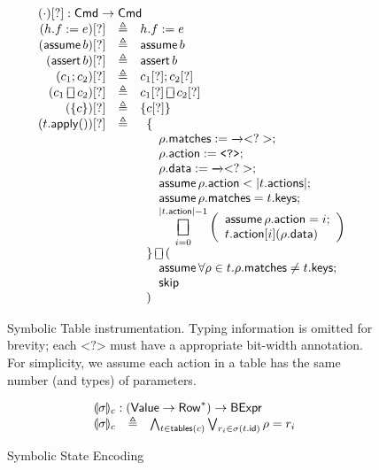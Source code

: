 \documentclass{article}
\newcommand{\Value}{\mathsf{Value}}
\newcommand{\BExpr}{\mathsf{BExpr}}
\newcommand{\Cmd}{\mathsf{Cmd}}
\newcommand{\Row}{\mathsf{Row}}
\newcommand{\matches}{\mathsf{matches}}
\newcommand{\action}{\mathsf{action}}
\newcommand{\actions}{\mathsf{actions}}
\newcommand{\keys}{\mathsf{keys}}
\newcommand{\data}{\mathsf{data}}
\newcommand{\id}{\mathsf{id}}
\newcommand{\assert}{\mathop{\mathsf{assert}}}
\newcommand{\assume}{\mathop{\mathsf{assume}}}
\newcommand{\apply}{\mathsf{apply}}
\newcommand{\choiceop}{\rotatebox[origin=c]{90}{$\sqsubset\!\!\!\sqsupset$}}
\newcommand{\choice}{\mathbin{\choiceop}}
\DeclareMathOperator*{\bigchoice}{\scalerel*{\choiceop}{\sum}}
\newcommand{\havoc}{\texttt{<?>}}
\newcommand{\SKIP}{\mathsf{skip}}
\newcommand{\state}[1]{\llparenthesis#1\rrparenthesis}
\newcommand{\tables}{\mathop{\mathsf{tables}}}
\begin{document}
\begin{figure}[htp]
  \[\begin{array}{r >{\triangleq}cl}
  \multicolumn{3}{l}{(\cdot)[?] : \Cmd \to \Cmd} \\
  (h.f := e)[?] && h.f := e \\
  (\assume b)[?] && \assume b \\
  (\assert b)[?] && \assert b\\
  (c_1;c_2)[?] && c_1[?];c_2[?]\\
  (c_1 \choice c_2)[?] && c_1[?] \choice c_2[?]\\
  (\{c\})[?] && \{c[?]\}\\
  (t.\apply())[?] &&
  \begin{array}[t]{l} \displaystyle
    \{ \\
    \quad \rho.\matches := \overrightarrow\havoc; \\
    \quad \rho.\action := \havoc;\\
    \quad \rho.\data := \overrightarrow\havoc; \\
    \quad \assume \rho.\action < |t.\actions|; \\
    \quad \assume \rho.\matches = t.\keys; \\
    \quad \displaystyle \bigchoice_{i=0}^{|t.\action| -1}
    \left(\begin{array}{l}
    \assume \rho.\action = i;\\
    t.\action[i](\rho.\data)
    \end{array}\right)\\
    \} \choice ( \\
    \quad \assume \forall \rho \in t. \rho.\matches \neq t.\keys; \\
    \quad \SKIP \\
    )
  \end{array}
  \end{array}
  \]
  \caption{Symbolic Table instrumentation. Typing information is omitted for
    brevity; each $\havoc$ must have a appropriate bit-width annotation. For
    simplicity, we assume each action in a table has the same number (and types) of
    parameters.}
  \label{fig:table-instrument}
\end{figure}

\begin{figure}[htp]
  \[\begin{array}{r >{\triangleq}cl}
  \multicolumn{3}{l}{\state\sigma_c : (\Value \to \Row^*) \to \BExpr} \\
  \state\sigma_c && \bigwedge_{ t \in \tables(c) } \bigvee_{r_i \in \sigma(t.\id)}
  \rho = r_i
  \end{array}
  \]
  \caption{Symbolic State Encoding}
  \label{fig:table-instrument}
\end{figure}
\end{document}
